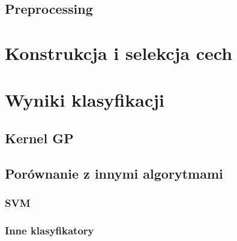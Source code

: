 	\subsection{Preprocessing}

\section{Konstrukcja i selekcja cech}
\section{Wyniki klasyfikacji}
	\subsection{Kernel GP}
	\subsection{Porównanie z innymi algorytmami}
		\subsubsection*{SVM}
		\subsubsection*{Inne klasyfikatory}
